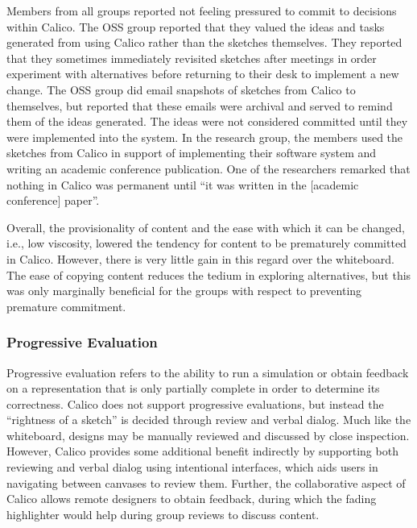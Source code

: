 Members from all groups reported not feeling pressured to commit to decisions within Calico. The OSS group reported that they valued the ideas and tasks generated from using Calico rather than the sketches themselves. They reported that they sometimes immediately revisited sketches after meetings in order experiment with alternatives before returning to their desk to implement a new change. The OSS group did email snapshots of sketches from Calico to themselves, but reported that these emails were archival and served to remind them of the ideas generated. The ideas were not considered committed until they were implemented into the system. In the research group, the members used the sketches from Calico in support of implementing their software system and writing an academic conference publication. One of the researchers remarked that nothing in Calico was permanent until ``it was written in the [academic conference] paper''. 

Overall, the provisionality of content and the ease with which it can be changed, i.e., low viscosity, lowered the tendency for content to be prematurely committed in Calico. However, there is very little gain in this regard over the whiteboard. The ease of copying content reduces the tedium in exploring alternatives, but this was only marginally beneficial for the groups with respect to preventing premature commitment.



\subsubsection{Progressive Evaluation}
Progressive evaluation refers to the ability to run a simulation or obtain feedback on a representation that is only partially complete in order to determine its correctness. Calico does not support progressive evaluations, but instead the ``rightness of a sketch'' is decided through review and verbal dialog. Much like the whiteboard, designs may be manually reviewed and discussed by close inspection. However, Calico provides some additional benefit indirectly by supporting both reviewing and verbal dialog using intentional interfaces, which aids users in navigating between canvases to review them. Further, the collaborative aspect of Calico allows remote designers to obtain feedback, during which the fading highlighter would help during group reviews to discuss content.

